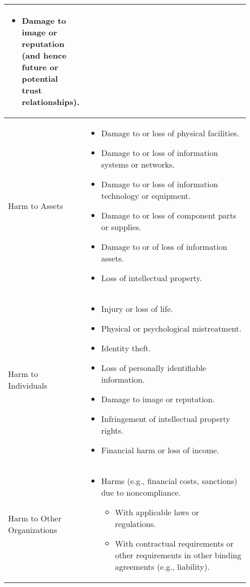 \documentclass[fleqn]{article}
\begin{document}
\begin{table}[H]
\begin{tabular}{|m{0.20\linewidth} | m{0.75\linewidth}|}
\begin{itemize}[noitemsep]
\begin{itemize}[noitemsep,nolistsep]
           			\item Damage to image or reputation (and hence future or potential trust relationships).
           		\end{itemize}
            \end{itemize} \\
            \hline
            Harm to Assets & 
            \begin{itemize}[noitemsep]
				\item Damage to or loss of physical facilities.
				\item  Damage to or loss of information systems or networks.
				\item Damage to or loss of information technology or equipment.
				\item Damage to or loss of component parts or supplies.
				\item Damage to or of loss of information assets.
				\item Loss of intellectual property.            	
            \end{itemize} \\
            \hline
            Harm to Individuals & 
            \begin{itemize}[noitemsep]
				\item Injury or loss of life.
				\item Physical or psychological mistreatment.
				\item Identity theft.
				\item Loss of personally identifiable information.
				\item Damage to image or reputation.
				\item Infringement of intellectual property rights.
				\item Financial harm or loss of income.	
			\end{itemize} \\            
            \hline
            Harm to Other Organizations & 
            \begin{itemize}[noitemsep]
				\item Harms (e.g., financial costs, sanctions) due to noncompliance. 
				\begin{itemize}[noitemsep,nolistsep]
					\item With applicable laws or regulations.
					\item With contractual requirements or other requirements in other binding agreements (e.g., liability).
				\end{itemize}

\end{itemize}
\end{tabular}
\end{table}
\end{document}

